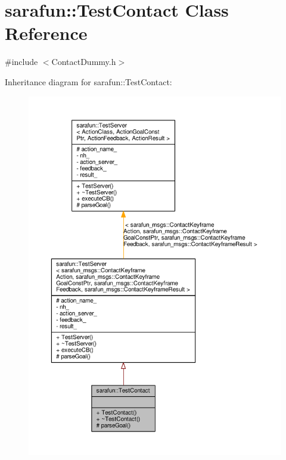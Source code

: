 \hypertarget{classsarafun_1_1TestContact}{\section{sarafun\-:\-:Test\-Contact Class Reference}
\label{classsarafun_1_1TestContact}
}


{\ttfamily \#include $<$Contact\-Dummy.\-h$>$}



Inheritance diagram for sarafun\-:\-:Test\-Contact\-:\nopagebreak
\begin{figure}[H]
\begin{center}
\leavevmode
\includegraphics[width=350pt]{d0/d79/classsarafun_1_1TestContact__inherit__graph}
\end{center}
\end{figure}


